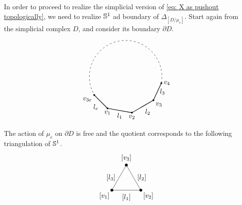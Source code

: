 In order to proceed to realize the simplicial version of \eqref{eq: X as pushout topologically}, we need to realize $\mathbb{S}^1$ ad boundary of $\Delta_{[D/\mu_e]}$. Start again from the simplicial complex $D$, and consider its boundary $\partial D$.
\begin{equation}
\begin{tikzpicture}[scale=0.75, >=stealth]
  \coordinate (v_e_start) at (210:2.5);
  \coordinate (v_1) at (240:2.5);
  \coordinate (v_2) at (280:2.5);
  \coordinate (v_3) at (320:2.5);
  \coordinate (v_4) at (350:2.5);

  \draw[dashed, black] (350:2.5) arc (350:570:2.5);

  \draw[thick] (v_e_start) -- (v_1) node[midway, below left] {$l_e$};
  \draw[thick] (v_1) -- (v_2) node[midway, below] {$l_1$};
  \draw[thick] (v_2) -- (v_3) node[midway, below right] {$l_2$};
  \draw[thick] (v_3) -- (v_4) node[midway, right] {$l_3$};

  \foreach \p in {v_e_start, v_1, v_2, v_3, v_4} {
    \filldraw[fill=black, draw=black] (\p) circle (1.5pt);
  }

  \node[below left] at (v_e_start) {$v_{3e}$};
  \node[below] at (v_1) {$v_1$};
  \node[below] at (v_2) {$v_2$};
  \node[below right] at (v_3) {$v_3$};
  \node[right] at (v_4) {$v_4$};
\end{tikzpicture}
\end{equation}
The action of $\mu_e$ on $\partial D$ is free and the quotient corresponds to the following triangulation of $\mathbb{S}^1$.
\begin{equation}\label{eq: dD/mue simplicial complex}
\begin{tikzpicture}[
    scale=1,
    dot/.style={circle, fill=black, inner sep=1.5pt}
]
    \coordinate (v1) at (0, 0);
    \coordinate (v2) at (1.5, 0);
    \coordinate (v3) at (0.75, 1.3);

    \draw (v1) -- (v2) node[midway, below=2pt] {$[l_1]$};
    \draw (v2) -- (v3) node[midway, right=2pt] {$[l_2]$};
    \draw (v3) -- (v1) node[midway, left=2pt] {$[l_3]$};

    \node[dot] at (v1) {};
    \node[dot] at (v2) {};
    \node[dot] at (v3) {};

    \node[below left=0pt] at (v1) {$[v_1]$};
    \node[below right=0pt] at (v2) {$[v_2]$};
    \node[above=2pt] at (v3) {$[v_3]$};

\end{tikzpicture}
\end{equation}
